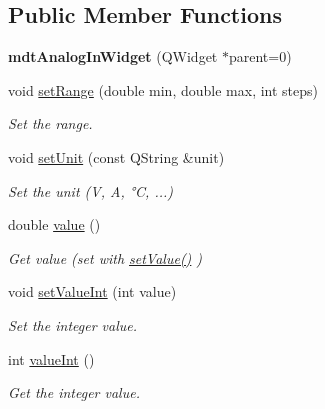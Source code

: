 \subsection*{Public Member Functions}
\begin{DoxyCompactItemize}
\item 
\hypertarget{classmdt_analog_in_widget_a40de3d4e8f96e0e7f6af0753d915d14d}{
{\bfseries mdtAnalogInWidget} (QWidget $\ast$parent=0)}
\label{classmdt_analog_in_widget_a40de3d4e8f96e0e7f6af0753d915d14d}

\item 
void \hyperlink{classmdt_analog_in_widget_a0a562239350a85cadda1353cf2e47183}{setRange} (double min, double max, int steps)
\begin{DoxyCompactList}\small\item\em Set the range. \end{DoxyCompactList}\item 
\hypertarget{classmdt_analog_in_widget_a489c8e03df8e649dea6ab96ab66d8372}{
void \hyperlink{classmdt_analog_in_widget_a489c8e03df8e649dea6ab96ab66d8372}{setUnit} (const QString \&unit)}
\label{classmdt_analog_in_widget_a489c8e03df8e649dea6ab96ab66d8372}

\begin{DoxyCompactList}\small\item\em Set the unit (V, A, °C, ...) \end{DoxyCompactList}\item 
\hypertarget{classmdt_analog_in_widget_a2beb0201c15c67ae812146b0ae91b83b}{
double \hyperlink{classmdt_analog_in_widget_a2beb0201c15c67ae812146b0ae91b83b}{value} ()}
\label{classmdt_analog_in_widget_a2beb0201c15c67ae812146b0ae91b83b}

\begin{DoxyCompactList}\small\item\em Get value (set with \hyperlink{classmdt_analog_in_widget_ab59995a9cc04fe152224b299c5b4cb55}{setValue()} ) \end{DoxyCompactList}\item 
void \hyperlink{classmdt_analog_in_widget_abd3db6845454d9869f33c716fc1084b4}{setValueInt} (int value)
\begin{DoxyCompactList}\small\item\em Set the integer value. \end{DoxyCompactList}\item 
int \hyperlink{classmdt_analog_in_widget_a0f29ef137b69f80a7ebf690348495a96}{valueInt} ()
\begin{DoxyCompactList}\small\item\em Get the integer value. \end{DoxyCompactList}\end{DoxyCompactItemize}


